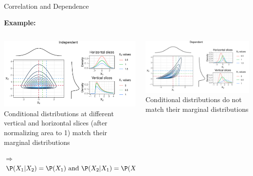 \documentclass[11pt,compress,t,notes=noshow, aspectratio=169, xcolor=table]{beamer}
\begin{document}
\begin{frame}{Correlation and Dependence}
	
\textbf{Example:}
\begin{columns}[T, totalwidth=\linewidth]
\begin{column}{0.49\linewidth}
\includegraphics[width=\linewidth]{figure/independent_slice.pdf}
Conditional distributions at different vertical and horizontal slices (after normalizing area to 1) match their marginal distributions
\medskip

$\Rightarrow$ $\P(X_1|X_2) = \P(X_1) \text{ and } \P(X_2|X_1) = \P(X_2)$
\end{column}
\hfill\pause
\begin{column}{0.49\linewidth}
\includegraphics[width=\linewidth]{figure/dependent_slice.pdf}
Conditional distributions do not match their marginal distributions
\end{column}
\end{columns}


\end{frame}
\end{document}
